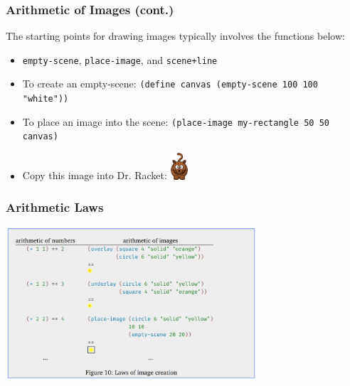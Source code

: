 \documentclass{beamer}
\begin{document}
\begin{frame}
  \frametitle{Arithmetic of Images (cont.)}
  The starting points for drawing images typically involves the functions below:
  \begin{itemize}
  \item<2-> \texttt{empty-scene}, \texttt{place-image},
    and \texttt{scene+line}
  \item<3-> To create an empty-scene:
    \texttt{(define canvas (empty-scene 100 100 "white"))}
  \item<4-> To place an image into the scene:
    \texttt{(place-image my-rectangle 50 50 canvas)}  
  \item<5-> Copy this image into Dr. Racket: \includegraphics[width=0.05\textwidth]{images/cat.png}    
  \end{itemize}
\end{frame}

\begin{frame}
  \frametitle{Arithmetic Laws}
  \begin{center}
    \includegraphics[width=0.7\textwidth]{images/Arithmetic-Images.png}
  \end{center}
\end{frame}


\end{document}
